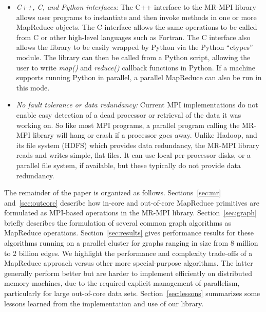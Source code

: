 \begin{itemize}
\item {\it C++, C, and Python interfaces:} The C++ interface to the
MR-MPI library allows user programs to instantiate and then invoke
methods in one or more MapReduce objects.  The C interface allows the
same operations to be called from C or other high-level languages such
as Fortran.  The C interface also allows the library to be easily
wrapped by Python via the Python ``ctypes'' module.  The library can
then be called from a Python script, allowing the user to write {\it
map()} and {\it reduce()} callback functions in Python.  If a machine
supports running Python in parallel, a parallel MapReduce can also be
run in this mode.

\item {\it No fault tolerance or data redundancy:} Current MPI
implementations do not enable easy detection of a dead processor or
retrieval of the data it was working on.  So like most MPI programs, a
parallel program calling the MR-MPI library will hang or crash if a
processor goes away.  Unlike Hadoop, and its file system (HDFS) which
provides data redundancy, the MR-MPI library reads and writes simple,
flat files.  It can use local per-processor disks, or a parallel file
system, if available, but these typically do not provide data redundancy.

\end{itemize}

The remainder of the paper is organized as follows.
Sections~\ref{sec:mr} and~\ref{sec:outcore} describe how in-core and
out-of-core MapReduce primitives are formulated as MPI-based
operations in the MR-MPI library.  Section~\ref{sec:graph} briefly
describes the formulation of several common graph algorithms as
MapReduce operations.  Section~\ref{sec:results} gives performance
results for these algorithms running on a parallel cluster for graphs
ranging in size from 8 million to 2 billion edges. We highlight the
performance and complexity trade-offs of a MapReduce approach versus
other more special-purpose algorithms.  The latter generally perform
better but are harder to implement efficiently on distributed memory
machines, due to the required explicit management of parallelism,
particularly for large out-of-core data sets.
Section~\ref{sec:lessons} summarizes some lessons learned from the
implementation and use of our library.

